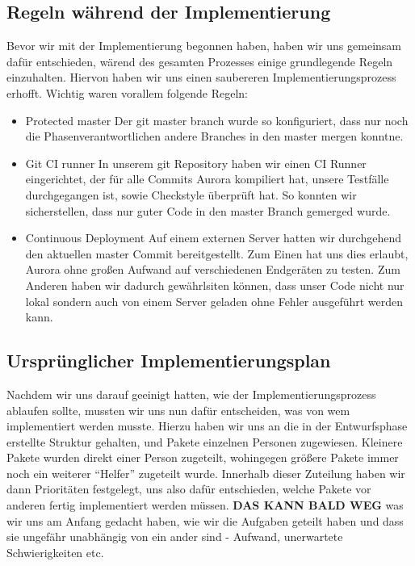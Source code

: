 \documentclass[parskip=full,11pt,twoside]{scrartcl}
\begin{document}
\subsection{Regeln während der Implementierung}
Bevor wir mit der Implementierung begonnen haben, haben wir uns gemeinsam dafür entschieden, wärend des gesamten Prozesses einige grundlegende Regeln einzuhalten.
Hiervon haben wir uns einen saubereren Implementierungsprozess erhofft.
Wichtig waren vorallem folgende Regeln:
\begin{itemize}
    \item Protected master
        \newline
        Der git master branch wurde so konfiguriert, dass nur noch die Phasenverantwortlichen andere Branches in den master mergen konntne.
    \item Git CI runner
        \newline
        In unserem git Repository haben wir einen CI Runner eingerichtet, der für alle Commits Aurora kompiliert hat, unsere Testfälle durchgegangen ist, sowie Checkstyle überprüft hat.
        So konnten wir sicherstellen, dass nur guter Code in den master Branch gemerged wurde.
    \item Continuous Deployment
        \newline
        Auf einem externen Server hatten wir durchgehend den aktuellen master Commit bereitgestellt.
        Zum Einen hat uns dies erlaubt, Aurora ohne großen Aufwand auf verschiedenen Endgeräten zu testen.
        Zum Anderen haben wir dadurch gewährlsiten können, dass unser Code nicht nur lokal sondern auch von einem Server geladen ohne Fehler ausgeführt werden kann.        
\end{itemize}

\subsection{Ursprünglicher Implementierungsplan}
Nachdem wir uns darauf geeinigt hatten, wie der Implementierungsprozess ablaufen sollte, mussten wir uns nun dafür entscheiden, was von wem implementiert werden musste.
Hierzu haben wir uns an die in der Entwurfsphase erstellte Struktur gehalten, und Pakete einzelnen Personen zugewiesen.
Kleinere Pakete wurden direkt einer Person zugeteilt, wohingegen größere Pakete immer noch ein weiterer \enquote{Helfer} zugeteilt wurde.
Innerhalb dieser Zuteilung haben wir dann Prioritäten festgelegt, uns also dafür entschieden, welche Pakete vor anderen fertig implementiert werden müssen.
\newline
\textbf{DAS KANN BALD WEG}
\newline
was wir uns am Anfang gedacht haben, wie wir die Aufgaben geteilt haben und dass sie ungefähr unabhängig von ein ander sind - Aufwand, unerwartete Schwierigkeiten etc.
\end{document}
